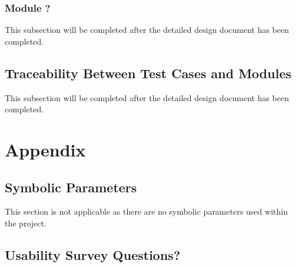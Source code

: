 \documentclass[12pt, titlepage]{article}
\begin{document}

\subsubsection{Module ?}
This subsection will be completed after the detailed design document has been completed.

\subsection{Traceability Between Test Cases and Modules}
This subsection will be completed after the detailed design document has been completed.


				




\newpage

\section{Appendix}


\subsection{Symbolic Parameters}


This section is not applicable as there are no symbolic parameters used within the project.


\subsection{Usability Survey Questions?}

\end{document}
